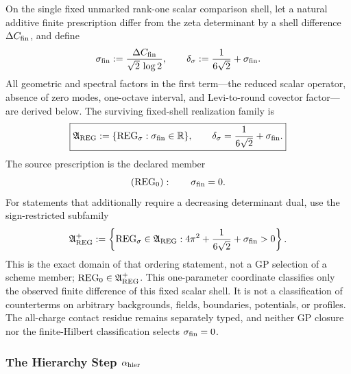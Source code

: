 \documentclass[12pt,a4paper]{article}
\begin{document}
\begin{definition}
\label{p3:def:determinant-shell-regularization}
On the single fixed unmarked rank-one scalar comparison shell, let a natural additive
finite prescription differ from the zeta determinant by a shell difference
\(\Delta C_{\rm fin}\), and define
\[
 \sigma_{\rm fin}:=\frac{\Delta C_{\rm fin}}{\sqrt2\,\log2},
 \qquad
 \delta_\sigma:=\frac1{6\sqrt2}+\sigma_{\rm fin}.
\]
All geometric and spectral factors in the first term---the reduced scalar
operator, absence of zero modes, one-octave interval, and Levi-to-round
covector factor---are derived below.  The surviving fixed-shell realization family is
\[
 \boxed{
 \mathfrak A_{\rm REG}
 :=\{\mathrm{REG}_{\sigma}:\sigma_{\rm fin}\in\mathbb R\},
 \qquad
 \delta_{\sigma}=\frac1{6\sqrt2}+\sigma_{\rm fin}.}
\]
The source prescription is the declared member
\[
 (\mathrm{REG}_0):\qquad \sigma_{\rm fin}=0.
\]
For statements that additionally require a decreasing determinant dual, use
the sign-restricted subfamily
\[
 \mathfrak A_{\rm REG}^{+}
 :=\left\{\mathrm{REG}_{\sigma}\in\mathfrak A_{\rm REG}:
 4\pi^2+\frac1{6\sqrt2}+\sigma_{\rm fin}>0\right\}.
\]
This is the exact domain of that ordering statement, not a GP selection of a
scheme member; \(\mathrm{REG}_0\in\mathfrak A_{\rm REG}^{+}\).
This one-parameter coordinate classifies only the observed finite difference
of this fixed scalar shell.  It is not a classification of counterterms on
arbitrary backgrounds, fields, boundaries, potentials, or profiles.  The
all-charge contact residue remains separately typed, and neither GP closure
nor the finite-Hilbert classification selects \(\sigma_{\rm fin}=0\).
\end{definition}



\subsubsection{\texorpdfstring{The Hierarchy Step $\alpha_{\rm hier}$}{The Hierarchy Step alpha hier}}
\end{document}
